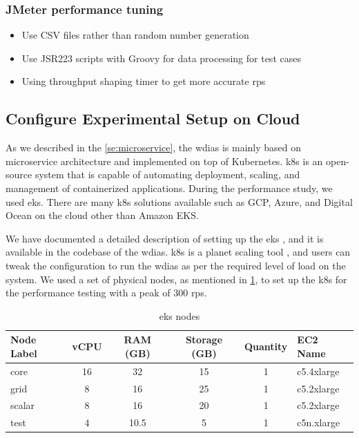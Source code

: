 \subsubsection{JMeter performance tuning}
\begin{itemize}
    \item Use CSV files rather than random number generation
    \item Use JSR223 scripts with Groovy for data processing for test cases
    \item Using throughput shaping timer to get more accurate \acrshort{rps}
\end{itemize}


\subsection{Configure Experimental Setup on Cloud}
\label{subse:test_sys_config}
As we described in the \cref{se:microservice}, the \acrshort{wdias} is mainly based on microservice architecture and implemented on top of Kubernetes. \acrfull{k8s} is an open-source system that is capable of automating deployment, scaling, and management of containerized applications. During the performance study, we used \acrfull{eks}. There are many \acrshort{k8s} solutions available such as GCP, Azure, and Digital Ocean on the cloud other than Amazon EKS.

We have documented a detailed description of setting up the \acrshort{eks} \cite{KarunarathneWDIASService}, and it is available in the codebase of the \acrshort{wdias}. \acrshort{k8s} is a planet scaling tool \cite{LinuxFoundationKubernetes:Orchestration}, and users can tweak the configuration to run the \acrshort{wdias} as per the required level of load on the system. We used a set of physical nodes, as mentioned in \cref{tab:aws_eks_nodes}, to set up the \acrshort{k8s} for the performance testing with a peak of 300 \acrshort{rps}.

\begin{table}[ht]
\centering
\caption{\acrshort{eks} nodes}
\footnotesize
\begin{tabular}{|l|c|c|c|c|l|}
\hline
\textbf{Node Label} & \textbf{vCPU} & \textbf{RAM (GB)} & \textbf{Storage (GB)} & \textbf{Quantity} & \textbf{EC2 Name} \\ \hline
core & 16 & 32 & 15 & 1 & c5.4xlarge \\ \hline
grid & 8 & 16 & 25 & 1 & c5.2xlarge \\ \hline
scalar & 8 & 16 & 20 & 1 & c5.2xlarge \\ \hline
test & 4 & 10.5 & 5 & 1 & c5n.xlarge \\ \hline
\end{tabular}
\label{tab:aws_eks_nodes}
\end{table}

